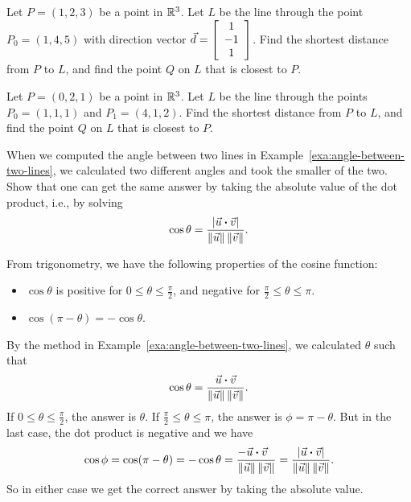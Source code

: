 \documentclass{ximera}
\begin{document}
\begin{exercise} Let $P = (1,2,3)$ be a point in $\R^3$. Let $L$ be the line
  through the point $P_0 = (1, 4, 5)$ with direction vector
  $\vect{d} = \startmat{c} 1 \\ -1 \\
    1 \stopmat$. Find the shortest distance from $P$ to
  $L$, and find the point $Q$ on $L$ that is closest to $P$.
\end{exercise}

\begin{exercise} Let $P = (0,2,1)$ be a point in $\R^3$. Let $L$ be the line through the points $P_0 = (1, 1, 1)$ and $P_1 = (4, 1, 2)$. Find the shortest distance from $P$ to $L$, and find the point $Q$ on $L$ that is closest to $P$.
\end{exercise}

\begin{exercise}\label{ex:angle-lines}
  When we computed the angle between two lines in
  Example~\ref{exa:angle-between-two-lines}, we calculated two
  different angles and took the smaller of the two. Show that one can
  get the same answer by taking the absolute value of the dot product,
  i.e., by solving
  \begin{equation*}
    \cos\theta =
    \frac{\abs{\vect{u}\dotprod\vect{v}}}{\norm{\vect{u}}\norm{\vect{v}}}.
  \end{equation*}
  \begin{solution}
    From trigonometry, we have the following properties of the cosine
    function:
    \begin{itemize}
    \item $\cos\theta$ is positive for $0\leq\theta\leq\frac{\pi}{2}$,
      and negative for $\frac{\pi}{2}\leq\theta\leq\pi$.
    \item $\cos(\pi-\theta) = -\cos\theta$.
    \end{itemize}
    By the method in Example~\ref{exa:angle-between-two-lines}, we
    calculated $\theta$ such that
    \begin{equation*}
      \cos\theta =
      \frac{\vect{u}\dotprod\vect{v}}{\norm{\vect{u}}\norm{\vect{v}}}.
    \end{equation*}
    If $0\leq\theta\leq\frac{\pi}{2}$, the answer is $\theta$. If
    $\frac{\pi}{2}\leq\theta\leq\pi$, the answer is $\phi=\pi-\theta$.
    But in the last case, the dot product is negative and we have
    \begin{equation*}
      \cos\phi = \cos(\pi-\theta) = -\cos\theta = \frac{-\vect{u}\dotprod\vect{v}~~}{\norm{\vect{u}}\norm{\vect{v}}}
      =
      \frac{\abs{\vect{u}\dotprod\vect{v}}}{\norm{\vect{u}}\norm{\vect{v}}}.
    \end{equation*}
    So in either case we get the correct answer by taking the absolute
    value.
  \end{solution}
\end{exercise}
\end{document}
